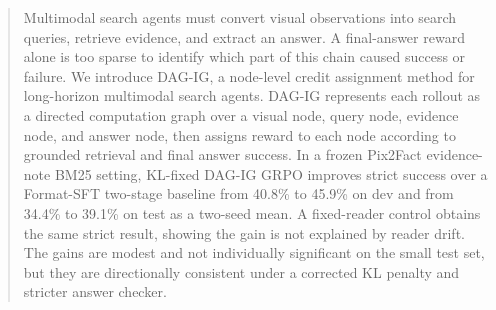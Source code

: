 \begin{abstract}
Multimodal search agents must convert visual observations into search queries, retrieve evidence, and extract an answer. A final-answer reward alone is too sparse to identify which part of this chain caused success or failure. We introduce DAG-IG, a node-level credit assignment method for long-horizon multimodal search agents. DAG-IG represents each rollout as a directed computation graph over a visual node, query node, evidence node, and answer node, then assigns reward to each node according to grounded retrieval and final answer success. In a frozen Pix2Fact evidence-note BM25 setting, KL-fixed DAG-IG GRPO improves strict success over a Format-SFT two-stage baseline from 40.8\% to 45.9\% on dev and from 34.4\% to 39.1\% on test as a two-seed mean. A fixed-reader control obtains the same strict result, showing the gain is not explained by reader drift. The gains are modest and not individually significant on the small test set, but they are directionally consistent under a corrected KL penalty and stricter answer checker.
\end{abstract}
